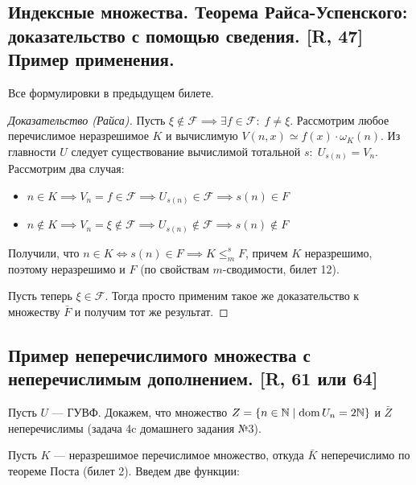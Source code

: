 \documentclass[a4paper, fleqn]{article}
\DeclareMathOperator{\dom}{\mathop{\mathrm{dom}}}
\newcommand{\mred}{\leqslant_m} %
\begin{document}
    \subsection{Индексные множества. Теорема Райса-Успенского: доказательство с помощью сведения. [R, 47] Пример применения.}

        Все формулировки в предыдущем билете.

        \begin{proof}[Доказательство (Райса)]
            Пусть $\xi \notin \mathcal{F} \implies \exists f \in \mathcal{F}: \; f \ne \xi$. Рассмотрим любое перечислимое неразрешимое $K$ и вычислимую $V(n, x) \simeq f(x) \cdot \omega_K(n)$. Из главности $U$ следует существование вычислимой тотальной $s : \; U_{s(n)} = V_n$. Рассмотрим два случая:

            \begin{itemize}
                \item $n \in K \implies V_n = f \in \mathcal{F} \implies U_{s(n)} \in \mathcal{F} \implies s(n) \in F$

                \item $n \notin K \implies V_n = \xi \notin \mathcal{F} \implies U_{s(n)} \notin \mathcal{F} \implies s(n) \notin F$
            \end{itemize}

            Получили, что $n \in K \iff s(n) \in F \implies K \mred^s F$, причем $K$ неразрешимо, поэтому неразрешимо и $F$ (по свойствам $m$-сводимости, билет 12).

            Пусть теперь $\xi \in \mathcal{F}$. Тогда просто применим такое же доказательство к множеству $\bar F$ и получим тот же результат.
        \end{proof}

    \subsection{Пример неперечислимого множества с неперечислимым дополнением. [R, 61 или 64]}

        Пусть $U$ --- ГУВФ. Докажем, что множество $Z = \{n \in \NN \mid \dom U_n = 2\NN \}$ и $\bar Z$ неперечислимы (задача 4c домашнего задания №3).

        Пусть $K$ --- неразрешимое перечислимое множество, откуда $\bar K$ неперечислимо по теореме Поста (билет 2). Введем две функции:
\end{document}
